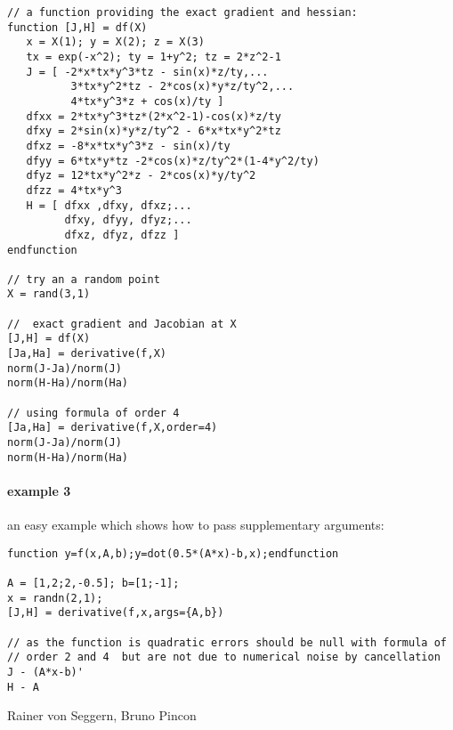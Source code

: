 \begin{examples}
\begin{Verbatim}
// a function providing the exact gradient and hessian: 
function [J,H] = df(X)
   x = X(1); y = X(2); z = X(3)
   tx = exp(-x^2); ty = 1+y^2; tz = 2*z^2-1
   J = [ -2*x*tx*y^3*tz - sin(x)*z/ty,...
          3*tx*y^2*tz - 2*cos(x)*y*z/ty^2,...
          4*tx*y^3*z + cos(x)/ty ]
   dfxx = 2*tx*y^3*tz*(2*x^2-1)-cos(x)*z/ty
   dfxy = 2*sin(x)*y*z/ty^2 - 6*x*tx*y^2*tz
   dfxz = -8*x*tx*y^3*z - sin(x)/ty
   dfyy = 6*tx*y*tz -2*cos(x)*z/ty^2*(1-4*y^2/ty)
   dfyz = 12*tx*y^2*z - 2*cos(x)*y/ty^2
   dfzz = 4*tx*y^3
   H = [ dfxx ,dfxy, dfxz;...
         dfxy, dfyy, dfyz;...
         dfxz, dfyz, dfzz ]
endfunction

// try an a random point
X = rand(3,1)

//  exact gradient and Jacobian at X
[J,H] = df(X)
[Ja,Ha] = derivative(f,X)
norm(J-Ja)/norm(J)
norm(H-Ha)/norm(Ha)

// using formula of order 4
[Ja,Ha] = derivative(f,X,order=4)
norm(J-Ja)/norm(J)
norm(H-Ha)/norm(Ha)
\end{Verbatim}
  
\paragraph{example 3} an easy example which shows how to pass
supplementary arguments:
\begin{Verbatim}
function y=f(x,A,b);y=dot(0.5*(A*x)-b,x);endfunction

A = [1,2;2,-0.5]; b=[1;-1]; 
x = randn(2,1); 
[J,H] = derivative(f,x,args={A,b}) 

// as the function is quadratic errors should be null with formula of 
// order 2 and 4  but are not due to numerical noise by cancellation 
J - (A*x-b)' 
H - A
\end{Verbatim}

\end{examples}


\begin{manseealso}
\end{manseealso}

\begin{authors}
  Rainer von Seggern, Bruno Pincon
\end{authors}

